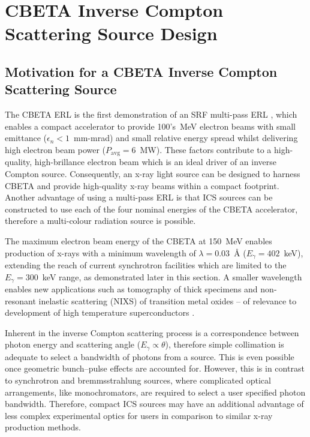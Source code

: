\documentclass[../main.tex]{subfiles}
\begin{document}
\chapter{CBETA Inverse Compton Scattering Source Design}
\label{CBETA_Inverse_Compton_Scattering_Source_Design} %

\section{Motivation for a CBETA Inverse Compton Scattering Source}

The CBETA ERL is the first demonstration of an SRF multi-pass ERL \cite{bartnik2020cbeta}, which enables a compact accelerator to provide 100's~\si{\mega\electronvolt} electron beams with small emittance ($\epsilon_{n} < 1$~\si{\milli\meter}-\si{\milli\radian}) and small relative energy spread whilst delivering high electron beam power ($P_{\mathrm{avg}} = 6$~\si{\mega\watt}). These factors contribute to a high-quality, high-brillance electron beam which is an ideal driver of an inverse Compton source. Consequently, an x-ray light source can be designed to harness CBETA and provide high-quality x-ray beams within a compact footprint. Another advantage of using a multi-pass ERL is that ICS sources can be constructed to use each of the four nominal energies of the CBETA accelerator, therefore a multi-colour radiation source is possible. 

The maximum electron beam energy of the CBETA at 150~\si{\mega\electronvolt} enables production of x-rays with a minimum wavelength of $\lambda = 0.03$~\si{\angstrom} ($E_{\gamma} = 402$~\si{\kilo\electronvolt}), extending the reach of current synchrotron facilities which are limited to the $E_{\gamma} = 300$~\si{\kilo\electronvolt} range, as demonstrated later in this section. A smaller wavelength enables new applications such as tomography of thick specimens and non-resonant inelastic scattering (NIXS) of transition metal oxides -- of relevance to development of high temperature superconductors \cite{isaacs1996resonant}.
 
Inherent in the inverse Compton scattering process is a correspondence between photon energy and scattering angle ($E_{\gamma} \propto \theta$), therefore simple collimation is adequate to select a bandwidth of photons from a source. This is even possible once geometric bunch--pulse effects are accounted for. However, this is in contrast to synchrotron and bremmsstrahlung sources, where complicated optical arrangements, like monochromators, are required to select a user specified photon bandwidth. Therefore, compact ICS sources may have an additional advantage of less complex experimental optics for users in comparison to similar x-ray production methods. 
 
\end{document}
